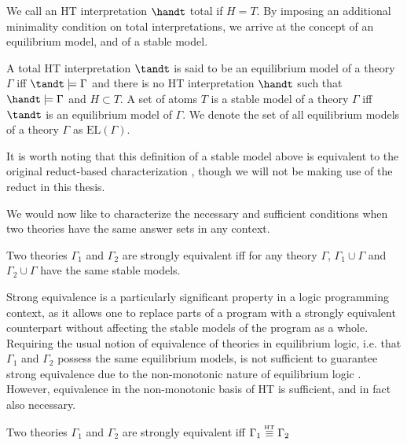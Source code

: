 We call an HT interpretation $\handt$ total if $H=T$. By imposing an
additional minimality condition on total interpretations, we arrive at
the concept of an equilibrium model, and of a stable model.

\begin{definition}
  A total HT interpretation $\tandt$ is said to be an equilibrium
  model of a theory $\Gamma$ iff $\tandt \models \Gamma$ and there is
  no HT interpretation $\handt$ such that $\handt \models \Gamma$ and
  $H \subset T$. A set of atoms $T$ is a stable model of a theory
  $\Gamma$ iff $\tandt$ is an equilibrium model of $\Gamma$. We denote
  the set of all equilibrium models of a theory $\Gamma$ as
  $\text{EL}(\Gamma)$.
\end{definition}

It is worth noting that this definition of a stable model above is
equivalent to the original reduct-based characterization
\cite{lipeva01a}, though we will not be making use of the reduct in
this thesis. 

We would now like to characterize the necessary and sufficient
conditions when two theories have the same answer sets in any context.

\begin{definition}
  Two theories $\Gamma_1$ and $\Gamma_2$ are strongly equivalent iff for
  any theory $\Gamma$, $\Gamma_1 \cup \Gamma$ and
  $\Gamma_2 \cup \Gamma$ have the same stable models.
\end{definition}

Strong equivalence is a particularly significant property in a logic
programming context, as it allows one to replace parts of a program
with a strongly equivalent counterpart without affecting the stable
models of the program as a whole. Requiring the usual notion of
equivalence of theories in equilibrium logic, i.e. that $\Gamma_1$ and
$\Gamma_2$ possess the same equilibrium models, is not sufficient to
guarantee strong equivalence due to the non-monotonic nature of
equilibrium logic \cite{lipeva01a}.  However, equivalence in the
non-monotonic basis of HT is sufficient, and in fact also necessary.

\begin{proposition}
  Two theories $\Gamma_1$ and $\Gamma_2$ are strongly equivalent
  iff $\Gamma_1 \stackrel{\normalfont\mbox{\tiny HT}}{\equiv} \Gamma_2$
\end{proposition}

